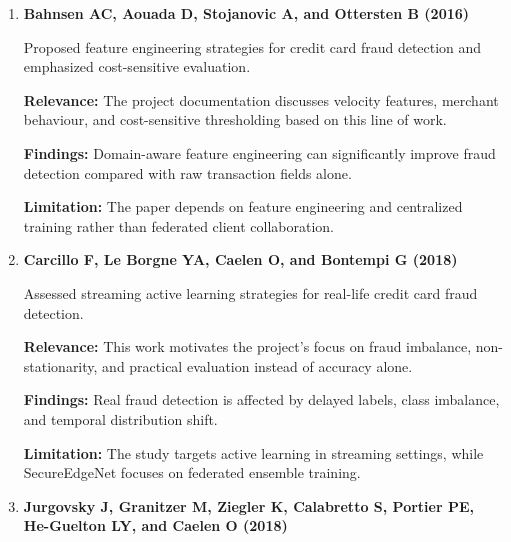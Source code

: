 \begin{enumerate}
    Studied probability calibration under undersampling for unbalanced classification, with application to credit card fraud detection.

    \textbf{Relevance:} SecureEdgeNet uses probability outputs and threshold tuning; calibrated probabilities are therefore important for reliable fraud decisions.

    \textbf{Findings:} Undersampling can preserve ranking performance but distort probability calibration, requiring correction when probabilities are used for decisions.

    \textbf{Limitation:} The work focuses on centralized undersampling and does not include federated training.

    \item \textbf{Bahnsen AC, Aouada D, Stojanovic A, and Ottersten B (2016) \cite{ref4}}

    Proposed feature engineering strategies for credit card fraud detection and emphasized cost-sensitive evaluation.

    \textbf{Relevance:} The project documentation discusses velocity features, merchant behaviour, and cost-sensitive thresholding based on this line of work.

    \textbf{Findings:} Domain-aware feature engineering can significantly improve fraud detection compared with raw transaction fields alone.

    \textbf{Limitation:} The paper depends on feature engineering and centralized training rather than federated client collaboration.

    \item \textbf{Carcillo F, Le Borgne YA, Caelen O, and Bontempi G (2018) \cite{ref5}}

    Assessed streaming active learning strategies for real-life credit card fraud detection.

    \textbf{Relevance:} This work motivates the project's focus on fraud imbalance, non-stationarity, and practical evaluation instead of accuracy alone.

    \textbf{Findings:} Real fraud detection is affected by delayed labels, class imbalance, and temporal distribution shift.

    \textbf{Limitation:} The study targets active learning in streaming settings, while SecureEdgeNet focuses on federated ensemble training.

    \item \textbf{Jurgovsky J, Granitzer M, Ziegler K, Calabretto S, Portier PE, He-Guelton LY, and Caelen O (2018) \cite{ref6}}


\end{enumerate}
